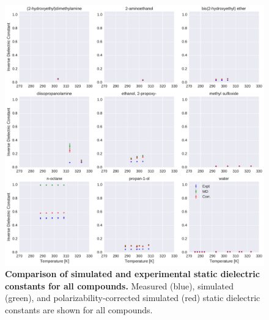 \documentclass[aps,pre,twocolumn,nofootinbib,superscriptaddress,linenumbers]{revtex4-1}
\begin{document}
\begin{figure}[alldielectric]

\ContinuedFloat

\includegraphics[width=\textwidth]{./figures/dielectric_versus_temperature_part1.pdf}

\caption{{\bf Comparison of simulated and experimental static dielectric constants for all compounds.}
Measured (blue), simulated (green), and polarizability-corrected simulated (red) static dielectric constants are shown for all compounds.
}

\label{figure:AllDielectrics}

\end{figure}
\end{document}
